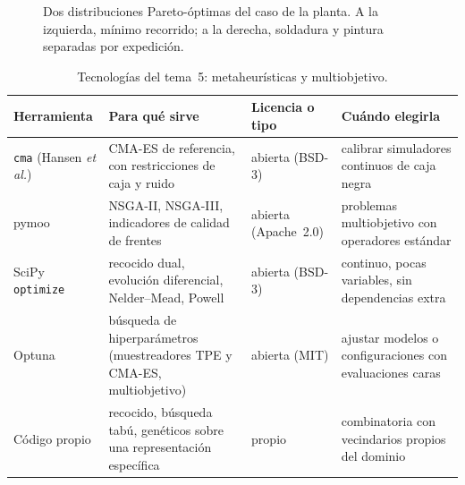 \begin{figure}[h]
\centering
{}
\caption{Dos distribuciones Pareto-óptimas del caso de la planta. A la izquierda, mínimo recorrido; a la derecha, soldadura y pintura separadas por expedición.}
\label{fig:planta}
\end{figure}

\begin{table}[h]
\centering\small
\caption{Tecnologías del tema~5: metaheurísticas y multiobjetivo.}\label{tab:tec5}
\begin{tabularx}{\textwidth}{@{}l>{\raggedright\arraybackslash}X>{\raggedright\arraybackslash}p{2.2cm}>{\raggedright\arraybackslash}X@{}}
\toprule
Herramienta & Para qué sirve & Licencia o tipo & Cuándo elegirla \\
\midrule
\texttt{cma} (Hansen \emph{et al.}) & CMA-ES de referencia, con restricciones de caja y ruido & abierta (BSD-3) & calibrar simuladores continuos de caja negra \\
pymoo~\cite{pymoo} & NSGA-II, NSGA-III, indicadores de calidad de frentes & abierta (Apache~2.0) & problemas multiobjetivo con operadores estándar \\
SciPy \texttt{optimize} & recocido dual, evolución diferencial, Nelder--Mead, Powell & abierta (BSD-3) & continuo, pocas variables, sin dependencias extra \\
Optuna & búsqueda de hiperparámetros (muestreadores TPE y CMA-ES, multiobjetivo) & abierta (MIT) & ajustar modelos o configuraciones con evaluaciones caras \\
Código propio & recocido, búsqueda tabú, genéticos sobre una representación específica & propio & combinatoria con vecindarios propios del dominio \\
\bottomrule
\end{tabularx}
\end{table}

